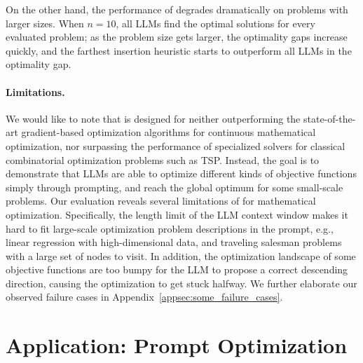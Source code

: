 On the other hand, the performance of \name{} degrades dramatically on problems with larger sizes. When $n=10$, all LLMs find the optimal solutions for every evaluated problem; as the problem size gets larger, the \name{} optimality gaps increase quickly, and the farthest insertion heuristic starts to outperform all LLMs in the optimality gap.

\paragraph{Limitations.} We would like to note that \name{} is designed for neither outperforming the state-of-the-art gradient-based optimization algorithms for continuous mathematical optimization, nor surpassing the performance of specialized solvers for classical combinatorial optimization problems such as TSP. Instead, the goal is to demonstrate that LLMs are able to optimize different kinds of objective functions simply through prompting, and reach the global optimum for some small-scale problems.
Our evaluation reveals several limitations of \name{} for mathematical optimization.
Specifically, the length limit of the LLM context window makes it hard to fit large-scale optimization problem descriptions in the prompt, e.g., linear regression with high-dimensional data, and traveling salesman problems with a large set of nodes to visit. In addition, the optimization landscape of some objective functions are too bumpy for the LLM to propose a correct descending direction, causing the optimization to get stuck halfway. We further elaborate our observed failure cases in Appendix~\ref{appsec:some_failure_cases}.\section{Application: Prompt Optimization}
\label{sec:application_prompt_opt}


